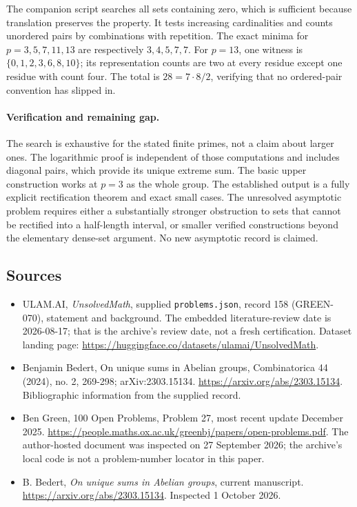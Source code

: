 \documentclass[11pt,a4paper]{article}
\begin{document}
The companion script searches all sets containing zero, which is sufficient because translation preserves the property. It tests increasing cardinalities and counts unordered pairs by combinations with repetition. The exact minima for $p=3,5,7,11,13$ are respectively $3,4,5,7,7$. For $p=13$, one witness is $\{0,1,2,3,6,8,10\}$; its representation counts are two at every residue except one residue with count four. The total is $28=7\cdot8/2$, verifying that no ordered-pair convention has slipped in.

\paragraph{Verification and remaining gap.}
The search is exhaustive for the stated finite primes, not a claim about larger ones. The logarithmic proof is independent of those computations and includes diagonal pairs, which provide its unique extreme sum. The basic upper construction works at $p=3$ as the whole group. The established output is a fully explicit rectification theorem and exact small cases. The unresolved asymptotic problem requires either a substantially stronger obstruction to sets that cannot be rectified into a half-length interval, or smaller verified constructions beyond the elementary dense-set argument. No new asymptotic record is claimed.

\subsection{Sources}

{\small

\begin{itemize}

\item[\hypertarget{source:158:1}{S1}] ULAM.AI, \emph{UnsolvedMath}, supplied \texttt{problems.json}, record 158 (GREEN-070), statement and background. The embedded literature-review date is 2026-08-17; that is the archive’s review date, not a fresh certification. Dataset landing page: \url{https://huggingface.co/datasets/ulamai/UnsolvedMath}.

\item[\hypertarget{source:158:2}{S2}] Benjamin Bedert, On unique sums in Abelian groups, Combinatorica 44 (2024), no. 2, 269-298; arXiv:2303.15134. \url{https://arxiv.org/abs/2303.15134}. Bibliographic information from the supplied record.

\item[\hypertarget{source:158:3}{S3}] Ben Green, 100 Open Problems, Problem 27, most recent update December 2025. \url{https://people.maths.ox.ac.uk/greenbj/papers/open-problems.pdf}. The author-hosted document was inspected on 27 September 2026; the archive’s local code is not a problem-number locator in this paper.

\item[E1] B. Bedert, \emph{On unique sums in Abelian groups}, current manuscript. \url{https://arxiv.org/abs/2303.15134}. Inspected 1 October 2026.

\end{itemize}

}

\label{end:158}
\end{document}
